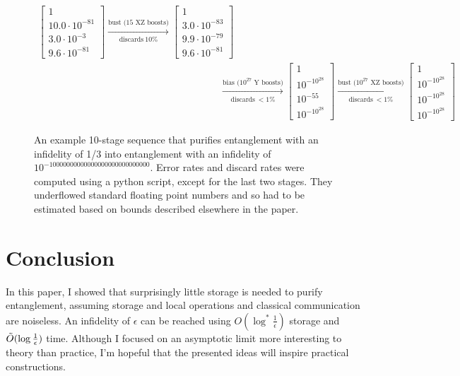 \documentclass[onecolumn,unpublished,a4paper]{quantumarticle}
\theoremstyle{definition}
\theoremstyle{definition}
\theoremstyle{definition}
\begin{document}
\begin{figure}
$$\begin{aligned}
        \begin{bmatrix}1\\10.0\cdot 10^{-81}\\3.0\cdot 10^{-3}\\9.6\cdot 10^{-81}\end{bmatrix}
        \xrightarrow[\text{discards}\ 10\%]{\text{bust (15 XZ boosts)}}
        \begin{bmatrix}1\\3.0\cdot 10^{-83}\\9.9\cdot 10^{-79}\\9.6\cdot 10^{-81}\end{bmatrix}
        \\&\xrightarrow[\text{discards}\ <1\%]{\text{bias (}10^{27}\text{ Y boosts)}}
        \begin{bmatrix}1\\10^{-10^{28}}\\10^{-55}\\10^{-10^{28}}\end{bmatrix}
        \xrightarrow[\text{discards}\ <1\%]{\text{bust (}10^{27}\text{ XZ boosts)}}
        \begin{bmatrix}1\\10^{-10^{28}}\\10^{-10^{28}}\\10^{-10^{28}}\end{bmatrix}
        \end{aligned}$$
    \caption{
        An example 10-stage sequence that purifies entanglement with an infidelity of 1/3 into entanglement with an infidelity of $10^{-10000000000000000000000000000}$.
        Error rates and discard rates were computed using a python script, except for the last two stages.
        They underflowed standard floating point numbers and so had to be estimated based on bounds described elsewhere in the paper.
    }
    \label{fig:stages}
\end{figure}

\section{Conclusion}
\label{sec:conclusion}

In this paper, I showed that surprisingly little storage is needed to purify entanglement, assuming storage and local operations and classical communication are noiseless.
An infidelity of $\epsilon$ can be reached using $O(\log^\ast \frac{1}{\epsilon})$ storage and $\Tilde{O}(\log \frac{1}{\epsilon})$ time.
Although I focused on an asymptotic limit more interesting to theory than practice, I'm hopeful that the presented ideas will inspire practical constructions.

\printbibliography
\end{document}
